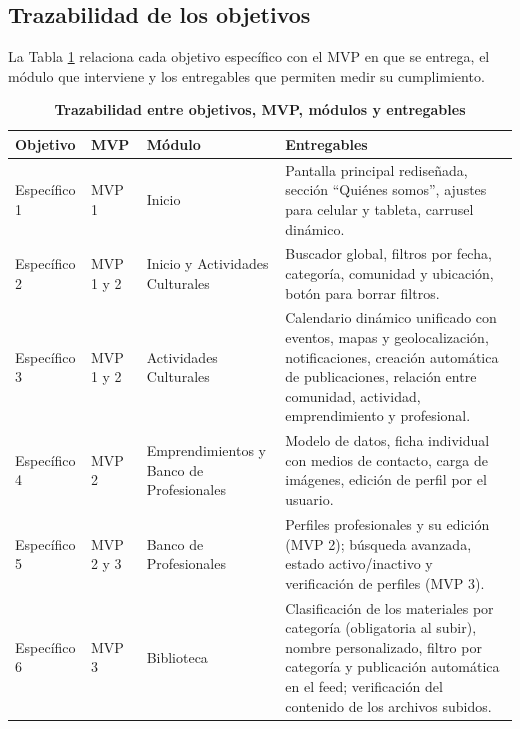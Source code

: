 \subsection{Trazabilidad de los objetivos}
La Tabla \ref{tab:trazabilidad} relaciona cada objetivo específico con el MVP en que se entrega, el módulo que interviene y los entregables que permiten medir su cumplimiento.

\begin{table}[H]
\centering
\small
\begin{tabular}{|p{1.7cm}|p{1.6cm}|p{3cm}|p{8.2cm}|}
\hline
\textbf{Objetivo} & \textbf{MVP} & \textbf{Módulo} & \textbf{Entregables} \\
\hline
Específico 1 & MVP 1 & Inicio & Pantalla principal rediseñada, sección ``Quiénes somos'', ajustes para celular y tableta, carrusel dinámico. \\
\hline
Específico 2 & MVP 1 y 2 & Inicio y Actividades Culturales & Buscador global, filtros por fecha, categoría, comunidad y ubicación, botón para borrar filtros. \\
\hline
Específico 3 & MVP 1 y 2 & Actividades Culturales & Calendario dinámico unificado con eventos, mapas y geolocalización, notificaciones, creación automática de publicaciones, relación entre comunidad, actividad, emprendimiento y profesional. \\
\hline
Específico 4 & MVP 2 & Emprendimientos y Banco de Profesionales & Modelo de datos, ficha individual con medios de contacto, carga de imágenes, edición de perfil por el usuario. \\
\hline
Específico 5 & MVP 2 y 3 & Banco de Profesionales & Perfiles profesionales y su edición (MVP 2); búsqueda avanzada, estado activo/inactivo y verificación de perfiles (MVP 3). \\
\hline
Específico 6 & MVP 3 & Biblioteca & Clasificación de los materiales por categoría (obligatoria al subir), nombre personalizado, filtro por categoría y publicación automática en el feed; verificación del contenido de los archivos subidos. \\
\hline
\end{tabular}
\caption{\textbf{Trazabilidad entre objetivos, MVP, módulos y entregables}}
\label{tab:trazabilidad}
\end{table}

